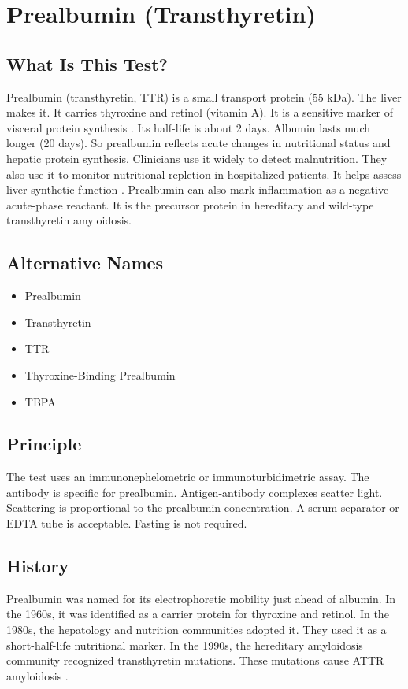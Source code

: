 \chapter{Prealbumin (Transthyretin)}

\section*{What Is This Test?}
Prealbumin (transthyretin, TTR) is a small transport protein (55 kDa). The liver makes it. It carries thyroxine and retinol (vitamin A). It is a sensitive marker of visceral protein synthesis \cite{bernstein1996prealbumin}. Its half-life is about 2 days. Albumin lasts much longer (20 days). So prealbumin reflects acute changes in nutritional status and hepatic protein synthesis. Clinicians use it widely to detect malnutrition. They also use it to monitor nutritional repletion in hospitalized patients. It helps assess liver synthetic function \cite{beck2002prealbumin}. Prealbumin can also mark inflammation as a negative acute-phase reactant. It is the precursor protein in hereditary and wild-type transthyretin amyloidosis.

\section*{Alternative Names}
\begin{itemize}
  \item Prealbumin
  \item Transthyretin
  \item TTR
  \item Thyroxine-Binding Prealbumin
  \item TBPA
\end{itemize}
\section*{Principle}
The test uses an immunonephelometric or immunoturbidimetric assay. The antibody is specific for prealbumin. Antigen-antibody complexes scatter light. Scattering is proportional to the prealbumin concentration. A serum separator or EDTA tube is acceptable. Fasting is not required.

\section*{History}
Prealbumin was named for its electrophoretic mobility just ahead of albumin. In the 1960s, it was identified as a carrier protein for thyroxine and retinol. In the 1980s, the hepatology and nutrition communities adopted it. They used it as a short-half-life nutritional marker. In the 1990s, the hereditary amyloidosis community recognized transthyretin mutations. These mutations cause ATTR amyloidosis \cite{liz2020narrative}.

